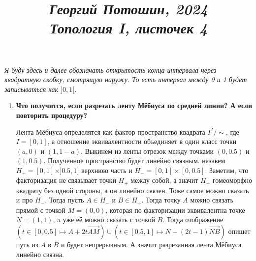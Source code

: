 \documentclass{article}
\title{
\textit{\small{Георгий Потошин, 2024}}\\
\vspace{0.3ex}
\textit{\huge{Топология I, листочек 4}}\vspace{1ex}
}
\date{\vspace{-10ex}}
\begin{document}
\maketitle
\textit{Я буду здесь и далее обозначать открытость конца интервала через
    квадратную скобку, смотрящую наружу. То есть интервал между 0 и 1 будет
    записываться как $]0,1[$.}

\begin{enumerate}
    \item 
        \textbf{Что получится, если разрезать ленту Мёбиуса по средней линии?
        А если повторить процедуру?}

        Лента Мёбиуса определятся как фактор пространство квадрата $I^2/\sim$,
        где $I=[0,1]$, а отношение эквивалентности объединяет в один класс
        точки $(a,0)$ и $(1,1-a)$. Выкинем из ленты отрезок между точками
        $(0,0.5)$ и $(1,0.5)$. Полученное пространство будет линейно связным.
        назавем $H_+=[0,1]\times]0.5,1]$ верхнюю часть и $H_-=[0,1]\times
        [0,0.5]$. Заметим, что факторизация не связывает точки $H_+$ между
        собой, а значит $H_+$ гомеоморфно квадрату без одной стороны, а он
        линейно связен. Тоже самое можно сказать и про $H_-$. Тогда пусть $A\in
        H_-$ и $B\in H_+$. Тогда точку $A$ можно связать прямой с точкой $M=
        (0,0)$, которая по факторизации эквивалентна точке $N=(1,1)$, a уже её
        можно связать с точкой $B$. Тогда отображение $(t\in[0,0.5]\mapsto A+2t
        \overrightarrow{AM})\cup(t\in[0.5,1]\mapsto N + (2t-1)\overrightarrow{NB})$
        опишет путь из $A$ в $B$ и будет непрерывным. А значит разрезанная
        лента Мёбиуса линейно связна.

        \begin{center}
        \end{center}


\end{enumerate}
\end{document}
